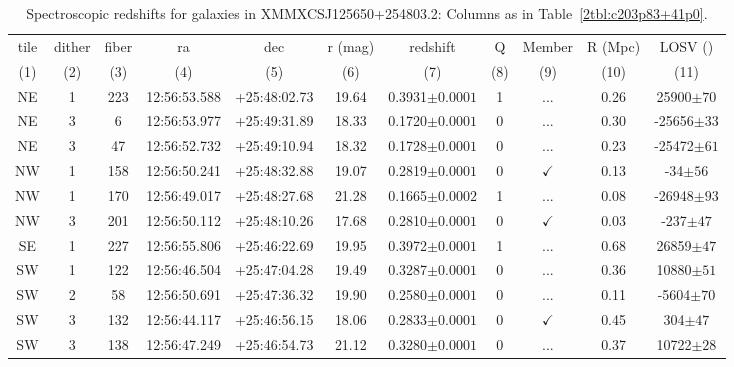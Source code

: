 \begin{landscape}
	\begin{table}
		\centering 
		\caption[Spectroscopic redshifts for galaxies in XMMXCSJ125650+254803.2.]{Spectroscopic redshifts for galaxies in XMMXCSJ125650+254803.2: Columns as in Table~\ref{2tbl:c203p83+41p0}.}
		\begin{tabular}{ccccccccccc}
			\hline
			tile & dither & fiber & ra & dec & r (mag) & redshift & Q & Member & R (Mpc) & LOSV (\kms) \\
			(1) & (2) & (3) & (4) & (5) & (6) & (7) & (8) & (9) & (10) & (11) \\
			\hline \hline
	NE & 1 & 223 & 12:56:53.588 & +25:48:02.73 & 19.64 & 0.3931$\pm{0.0001}$ & 1 & ... & 0.26 & 25900$\pm{70}$ \\
	NE & 3 & 6 & 12:56:53.977 & +25:49:31.89 & 18.33 & 0.1720$\pm{0.0001}$ & 0 & ... & 0.30 & -25656$\pm{33}$ \\
	NE & 3 & 47 & 12:56:52.732 & +25:49:10.94 & 18.32 & 0.1728$\pm{0.0001}$ & 0 & ... & 0.23 & -25472$\pm{61}$ \\
	NW & 1 & 158 & 12:56:50.241 & +25:48:32.88 & 19.07 & 0.2819$\pm{0.0001}$ & 0 & $\checkmark$ & 0.13 & -34$\pm{56}$ \\
	NW & 1 & 170 & 12:56:49.017 & +25:48:27.68 & 21.28 & 0.1665$\pm{0.0002}$ & 1 & ... & 0.08 & -26948$\pm{93}$ \\
	NW & 3 & 201 & 12:56:50.112 & +25:48:10.26 & 17.68 & 0.2810$\pm{0.0001}$ & 0 & $\checkmark$ & 0.03 & -237$\pm{47}$ \\
	SE & 1 & 227 & 12:56:55.806 & +25:46:22.69 & 19.95 & 0.3972$\pm{0.0001}$ & 1 & ... & 0.68 & 26859$\pm{47}$ \\
	SW & 1 & 122 & 12:56:46.504 & +25:47:04.28 & 19.49 & 0.3287$\pm{0.0001}$ & 0 & ... & 0.36 & 10880$\pm{51}$ \\
	SW & 2 & 58 & 12:56:50.691 & +25:47:36.32 & 19.90 & 0.2580$\pm{0.0001}$ & 0 & ... & 0.11 & -5604$\pm{70}$ \\
	SW & 3 & 132 & 12:56:44.117 & +25:46:56.15 & 18.06 & 0.2833$\pm{0.0001}$ & 0 & $\checkmark$ & 0.45 & 304$\pm{47}$ \\
	SW & 3 & 138 & 12:56:47.249 & +25:46:54.73 & 21.12 & 0.3280$\pm{0.0001}$ & 0 & ... & 0.37 & 10722$\pm{28}$ \\
			\hline
		\end{tabular}
		\label{2tbl:XMMXCSJ125650+254803.2}
	\end{table}
\end{landscape}

